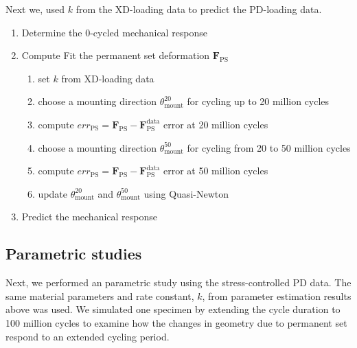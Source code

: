 Next we, used $k $ from the XD-loading data to predict the PD-loading data. 
\begin{enumerate}
\item Determine the 0-cycled mechanical response
\item Compute Fit the permanent set deformation $\mathbf{F}_\mathrm{PS}$
	\begin{enumerate}
	\item set $k $ from XD-loading data
	\item choose a mounting direction $\theta_\mathrm{mount}^{20}$ for cycling up to 20 million cycles 
	\item compute $err_\mathrm{PS} = \mathbf{F}_\mathrm{PS} - \mathbf{F}_\mathrm{PS}^\mathrm{data}$ error at 20 million cycles
	\item choose a mounting direction $\theta_\mathrm{mount}^{50}$ for cycling from 20 to 50 million cycles 
	\item compute $err_\mathrm{PS} = \mathbf{F}_\mathrm{PS} - \mathbf{F}_\mathrm{PS}^\mathrm{data}$ error at 50 million cycles
	\item update $\theta_\mathrm{mount}^{20}$ and $\theta_\mathrm{mount}^{50}$ using Quasi-Newton
	\end{enumerate}
\item Predict the mechanical response 
\end{enumerate}

\subsection{Parametric studies}
Next, we performed an parametric study using the stress-controlled PD data. The same material parameters and rate constant, $k$, from parameter estimation results above was used. We simulated one specimen by extending the cycle duration to 100 million cycles to examine how the changes in geometry due to permanent set respond to an extended cycling period. 